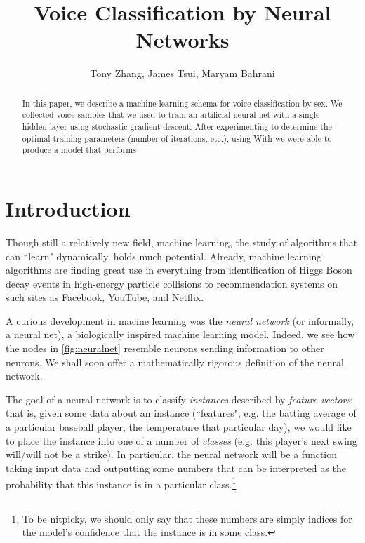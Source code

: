 \documentclass[10pt]{article}
\title{Voice Classification by Neural Networks}
\author{Tony Zhang, James Tsui, Maryam Bahrani}
\begin{document}
\maketitle

\begin{abstract}
% 

In this paper, we describe a machine learning schema for voice classification by sex. We collected %
voice samples that we used to train an artificial neural net with a single hidden layer using stochastic gradient descent. After experimenting to determine the optimal training parameters (number of iterations, etc.), using %
With %
we were able to produce a model that performs %
\end{abstract}

\section{Introduction}


Though still a relatively new field, machine learning, the study of algorithms that can ``learn" dynamically, holds much potential.
Already, machine learning algorithms are finding great use in everything from identification of Higgs Boson decay events in high-energy particle collisions to recommendation systems on such sites as Facebook, YouTube, and Netflix.

A curious development in macine learning was the \emph{neural network} (or informally, a neural net), a biologically inspired machine learning model.
Indeed, we see how the nodes in \cref{fig:neuralnet} resemble neurons sending information to other neurons.
We shall soon offer a mathematically rigorous definition of the neural network.

The goal of a neural network is to classify \emph{instances} described by \emph{feature vectors}; that is, given some data about an instance (``features", e.g. the batting average of a particular baseball player, the temperature that particular day), we would like to place the instance into one of a number of \emph{classes} (e.g. this player's next swing will/will not be a strike).
In particular, the neural network will be a function taking input data and outputting some numbers that can be interpreted as the probability that this instance is in a particular class.\footnote{To be nitpicky, we should only say that these numbers are simply indices for the model's confidence that the instance is in some class.}
\end{document}
